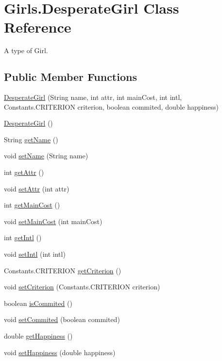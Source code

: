 \hypertarget{class_girls_1_1_desperate_girl}{}\section{Girls.\+Desperate\+Girl Class Reference}
\label{class_girls_1_1_desperate_girl}


A type of Girl.  


\subsection*{Public Member Functions}
\begin{DoxyCompactItemize}
\item 
\hyperlink{class_girls_1_1_desperate_girl_a304398a8ff3cfeed4f9724f5bcbc4df8}{Desperate\+Girl} (String name, int attr, int main\+Cost, int intl, Constants.\+C\+R\+I\+T\+E\+R\+I\+ON criterion, boolean commited, double happiness)
\item 
\hyperlink{class_girls_1_1_desperate_girl_a8477909adea5287c9507d4c267eda917}{Desperate\+Girl} ()
\item 
String \hyperlink{class_girls_1_1_desperate_girl_a12eaf26350d6d8abfc533c8b25155ee1}{get\+Name} ()
\item 
void \hyperlink{class_girls_1_1_desperate_girl_a586ddff032ee66768ba5d5a730b26c2e}{set\+Name} (String name)
\item 
int \hyperlink{class_girls_1_1_desperate_girl_a4703dc8c2fff932229f42f2de063c403}{get\+Attr} ()
\item 
void \hyperlink{class_girls_1_1_desperate_girl_a9d1337778c8c5cd44731d06871fd6a82}{set\+Attr} (int attr)
\item 
int \hyperlink{class_girls_1_1_desperate_girl_af1049d0cfe03c306591f01fce38b1479}{get\+Main\+Cost} ()
\item 
void \hyperlink{class_girls_1_1_desperate_girl_aa8242123882557dfde4bdd0a597123ad}{set\+Main\+Cost} (int main\+Cost)
\item 
int \hyperlink{class_girls_1_1_desperate_girl_ab752558cdcede9ff40a529a0a35a1073}{get\+Intl} ()
\item 
void \hyperlink{class_girls_1_1_desperate_girl_a1461d21179b23347b28889b5b3354ec5}{set\+Intl} (int intl)
\item 
Constants.\+C\+R\+I\+T\+E\+R\+I\+ON \hyperlink{class_girls_1_1_desperate_girl_a50f926858ed67bb581ca86bea60b5df0}{get\+Criterion} ()
\item 
void \hyperlink{class_girls_1_1_desperate_girl_a1e90c75d30f9e01b49e2e44fcf234472}{set\+Criterion} (Constants.\+C\+R\+I\+T\+E\+R\+I\+ON criterion)
\item 
boolean \hyperlink{class_girls_1_1_desperate_girl_a8894cd5d69230daf146c111b8606a7d6}{is\+Commited} ()
\item 
void \hyperlink{class_girls_1_1_desperate_girl_a083295aa0508dae190f64ee9fb65e828}{set\+Commited} (boolean commited)
\item 
double \hyperlink{class_girls_1_1_desperate_girl_aabbb3994973c9209f21b8303e9031d4b}{get\+Happiness} ()
\item 
void \hyperlink{class_girls_1_1_desperate_girl_a023738091a72b2532763ad8a9bbf9dbb}{set\+Happiness} (double happiness)
\end{DoxyCompactItemize}
